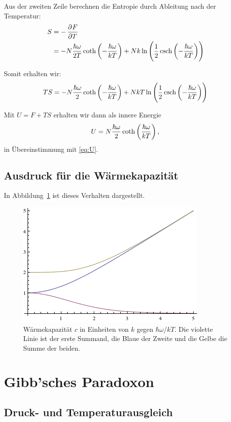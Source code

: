Aus der zweiten Zeile berechnen die Entropie durch Ableitung nach der Temperatur:
\begin{align*}
    S
    &= - \dpd FT \\
    &= - N \frac{\hbar\omega}{2T} \coth\del{-\frac{\hbar\omega}{kT}} + N k \ln\del{\frac 12 \csch\del{-\frac{\hbar\omega}{kT}}}
\end{align*}

Somit erhalten wir:
\[
    TS = - N \frac{\hbar\omega}{2} \coth\del{-\frac{\hbar\omega}{kT}} + N k T \ln\del{\frac 12 \csch\del{-\frac{\hbar\omega}{kT}}}
\]

Mit $U = F + TS$ erhalten wir dann als innere Energie
\[
    U = N \frac{\hbar\omega}{2} \coth\del{\frac{\hbar\omega}{kT}},
\]
in Übereinstimmung mit \eqref{eq:U}.

\subsection{Ausdruck für die Wärmekapazität}

In Abbildung~\ref{fig:1d-c} ist dieses Verhalten dargestellt.

\begin{figure}[htbp]
    \centering
    \includegraphics[width=0.6\linewidth]{1d.png}
    \caption{%
        Wärmekapazität $c$ in Einheiten von $k$ gegen $\hbar\omega / kT$. Die
        violette Linie ist der erste Summand, die Blaue der Zweite und die
        Gelbe die Summe der beiden.
    }
    \label{fig:1d-c}
\end{figure}

\section{Gibb'sches Paradoxon}

\subsection{Druck- und Temperaturausgleich}

